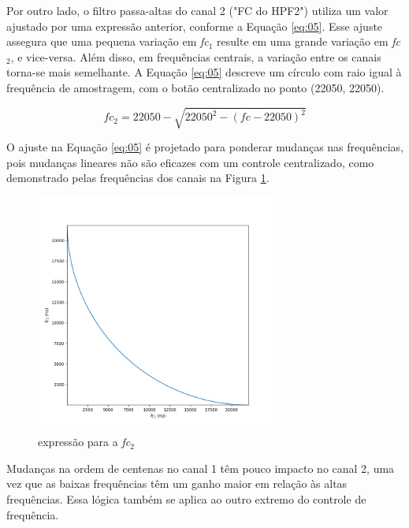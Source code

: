 Por outro lado, o filtro passa-altas do canal 2 ("FC do HPF2") utiliza um valor ajustado por uma expressão anterior, conforme a Equação \ref{eq:05}. Esse ajuste assegura que uma pequena variação em \textit{fc$_{1}$} resulte em uma grande variação em \textit{fc$_{2}$}, e vice-versa. Além disso, em frequências centrais, a variação entre os canais torna-se mais semelhante. A Equação \ref{eq:05} descreve um círculo com raio igual à frequência de amostragem, com o botão centralizado no ponto (22050, 22050).

\begin{equation}  \label{eq:05}
    fc_2 = 22050 - \sqrt{22050^2 - (fc - 22050)^2}
\end{equation}

O ajuste na Equação \ref{eq:05} é projetado para ponderar mudanças nas frequências, pois mudanças lineares não são eficazes com um controle centralizado, como demonstrado pelas frequências dos canais na Figura \ref{fig45}.

\begin{figure}[h]
    \centering
    \includegraphics[width=0.7\textwidth]{figuras/fig45.png}
    \caption{expressão para a \textit{fc$_{2}$}}
    \label{fig45}
\end{figure}

Mudanças na ordem de centenas no canal 1 têm pouco impacto no canal 2, uma vez que as baixas frequências têm um ganho maior em relação às altas frequências. Essa lógica também se aplica ao outro extremo do controle de frequência.

